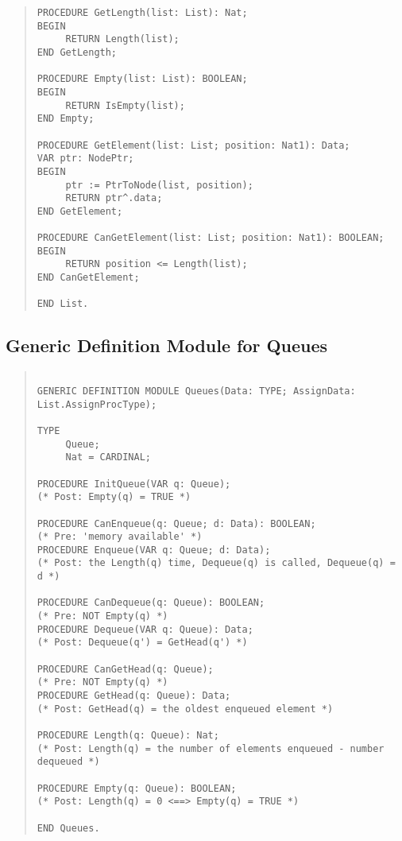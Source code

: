 \begin{quote}
\begin{verbatim}
PROCEDURE GetLength(list: List): Nat;
BEGIN
     RETURN Length(list);
END GetLength;

PROCEDURE Empty(list: List): BOOLEAN;
BEGIN
     RETURN IsEmpty(list);
END Empty;

PROCEDURE GetElement(list: List; position: Nat1): Data;
VAR ptr: NodePtr;
BEGIN
     ptr := PtrToNode(list, position);
     RETURN ptr^.data;
END GetElement;

PROCEDURE CanGetElement(list: List; position: Nat1): BOOLEAN;
BEGIN
     RETURN position <= Length(list);
END CanGetElement;

END List.

\end{verbatim}
\end{quote}
\subsection{Generic Definition Module for Queues}
\begin{quote}
\begin{verbatim}

GENERIC DEFINITION MODULE Queues(Data: TYPE; AssignData: List.AssignProcType);

TYPE
     Queue;
     Nat = CARDINAL;

PROCEDURE InitQueue(VAR q: Queue);
(* Post: Empty(q) = TRUE *)

PROCEDURE CanEnqueue(q: Queue; d: Data): BOOLEAN;
(* Pre: 'memory available' *)
PROCEDURE Enqueue(VAR q: Queue; d: Data);
(* Post: the Length(q) time, Dequeue(q) is called, Dequeue(q) = d *)

PROCEDURE CanDequeue(q: Queue): BOOLEAN;
(* Pre: NOT Empty(q) *)
PROCEDURE Dequeue(VAR q: Queue): Data;
(* Post: Dequeue(q') = GetHead(q') *)

PROCEDURE CanGetHead(q: Queue);
(* Pre: NOT Empty(q) *)
PROCEDURE GetHead(q: Queue): Data;
(* Post: GetHead(q) = the oldest enqueued element *)
 
PROCEDURE Length(q: Queue): Nat;
(* Post: Length(q) = the number of elements enqueued - number dequeued *)

PROCEDURE Empty(q: Queue): BOOLEAN;
(* Post: Length(q) = 0 <==> Empty(q) = TRUE *)

END Queues.

\end{verbatim}
\end{quote}
